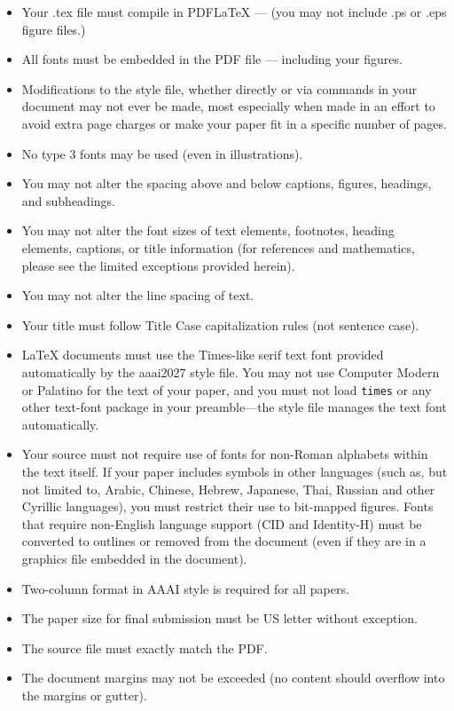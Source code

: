 \documentclass[letterpaper]{article} %
\begin{document}
\begin{itemize}
\item Your .tex file must compile in PDF\LaTeX{} --- (you may not include .ps or .eps figure files.)
\item All fonts must be embedded in the PDF file --- including your figures.
\item Modifications to the style file, whether directly or via commands in your document may not ever be made, most especially when made in an effort to avoid extra page charges or make your paper fit in a specific number of pages.
\item No type 3 fonts may be used (even in illustrations).
\item You may not alter the spacing above and below captions, figures, headings, and subheadings.
\item You may not alter the font sizes of text elements, footnotes, heading elements, captions, or title information (for references and mathematics, please see the limited exceptions provided herein).
\item You may not alter the line spacing of text.
\item Your title must follow Title Case capitalization rules (not sentence case).
\item \LaTeX{} documents must use the Times-like serif text font provided automatically by the aaai2027 style file. You may not use Computer Modern or Palatino for the text of your paper, and you must not load \texttt{times} or any other text-font package in your preamble---the style file manages the text font automatically.
\item Your source must not require use of fonts for non-Roman alphabets within the text itself. If your paper includes symbols in other languages (such as, but not limited to, Arabic, Chinese, Hebrew, Japanese, Thai, Russian and other Cyrillic languages), you must restrict their use to bit-mapped figures. Fonts that require non-English language support (CID and Identity-H) must be converted to outlines or removed from the document (even if they are in a graphics file embedded in the document).
\item Two-column format in AAAI style is required for all papers.
\item The paper size for final submission must be US letter without exception.
\item The source file must exactly match the PDF.
\item The document margins may not be exceeded (no content should overflow into the margins or gutter).

\end{itemize}
\end{document}
